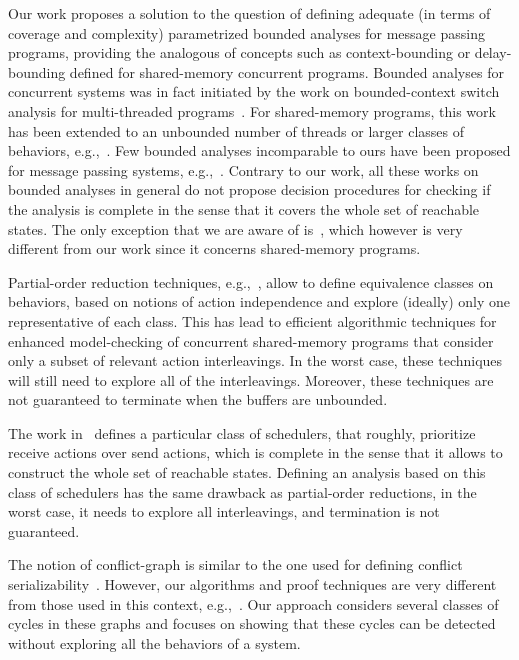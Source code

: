 Our work proposes a solution to the question of defining adequate (in terms of coverage and complexity) parametrized bounded analyses for message passing programs, providing the analogous of concepts such as context-bounding or delay-bounding defined for shared-memory concurrent programs. Bounded analyses for concurrent systems
was in fact initiated by the work on bounded-context switch analysis for multi-threaded programs~\cite{DBLP:conf/pldi/QadeerW04,DBLP:conf/tacas/QadeerR05,DBLP:conf/cav/LalR08}. For shared-memory programs, this work has been extended to an unbounded number of threads or larger classes of behaviors, e.g.,~\cite{DBLP:conf/sas/BouajjaniEP11,DBLP:conf/popl/EmmiQR11,DBLP:conf/spin/KiddJV10,DBLP:conf/cav/TorreMP10}. Few bounded analyses incomparable to ours have been proposed for message passing systems, e.g.,~\cite{DBLP:conf/tacas/TorreMP08,DBLP:conf/tacas/BouajjaniE12}. Contrary to our work, all these works on bounded analyses in general do not propose decision procedures for checking if the analysis is complete in the sense that it covers the whole set of reachable states. The only exception that we are aware of is~\cite{DBLP:conf/cav/TorreMP10}, which however is very different from our work since it concerns shared-memory programs.  

Partial-order reduction techniques, e.g.,~\cite{DBLP:conf/popl/AbdullaAJS14,DBLP:conf/popl/FlanaganG05}, allow to define equivalence classes on behaviors, based on notions of action independence and explore (ideally) only one representative of each class. This has lead to efficient algorithmic techniques for enhanced model-checking of concurrent shared-memory programs that consider only a subset of relevant action interleavings. In the worst case, these techniques will still need to explore all of the interleavings. Moreover, these techniques are not guaranteed to terminate when the buffers are unbounded.

The work in~\cite{DBLP:conf/oopsla/Desai0M14} defines a particular class of schedulers, that roughly, prioritize receive actions over send actions, which is complete in the sense that it allows to construct the whole set of reachable states. Defining an analysis based on this class of schedulers has the same drawback as partial-order reductions, in the worst case, it needs to explore all interleavings, and termination is not guaranteed. 

The notion of conflict-graph is similar to the one used for defining conflict serializability~\cite{journals/jacm/Papadimitriou79b}. However, our algorithms and proof techniques are very different from those used in this context, e.g.,~\cite{DBLP:journals/iandc/AlurMP00,DBLP:conf/esop/BouajjaniEEH13,DBLP:conf/cav/FarzanM08}. Our approach considers several classes of cycles in these graphs and focuses on showing that these cycles can be detected without exploring all the behaviors of a system.

